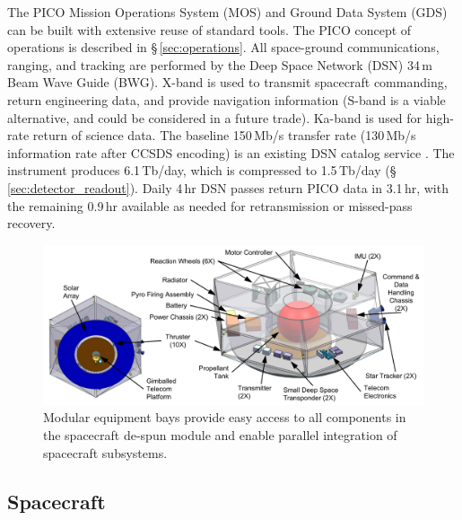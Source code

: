 The PICO Mission Operations System (MOS) and Ground Data System (GDS)
can be built with extensive reuse of standard tools. The PICO concept
of operations is described in \S\,\ref{sec:operations}.
All space-ground communications, ranging, and tracking are performed
by the Deep Space Network (DSN) 34\,m Beam Wave Guide (BWG). X-band is
used to transmit spacecraft commanding, return engineering data, and
provide navigation information (S-band is a viable alternative, and
could be considered in a future trade). Ka-band is used for high-rate
return of science data.  The baseline 150\,Mb/s transfer rate
(130\,Mb/s information rate after CCSDS encoding) is an existing DSN
catalog service \cite{DSN2015}.  The instrument produces 6.1\,Tb/day,
which is compressed to 1.5\,Tb/day
(\S\,\ref{sec:detector_readout}). Daily 4\,hr DSN passes return PICO
data in 3.1\,hr, with the remaining 0.9\,hr available as needed for
retransmission or missed-pass recovery.


\begin{figure}
\begin{center}
\includegraphics[width=\textwidth]{figures/Spacecraft.png}
\caption{\captiontext
  Modular equipment bays provide easy access to all components
  in the spacecraft de-spun module and enable parallel integration of
  spacecraft subsystems.\label{fig:Spacecraft}}
\end{center}
\end{figure}

\subsection{Spacecraft}
\label{sec:spacecraft} %

